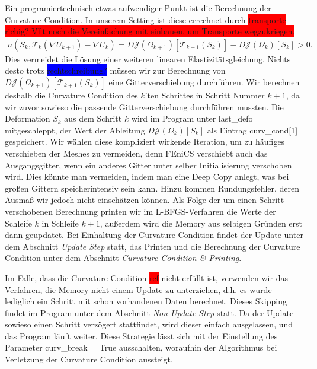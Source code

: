 \documentclass[bibliography=totoc,12pt,a4paper]{scrartcl}
\theoremstyle{exampstyle}
\numberwithin{equation}{section}
\begin{document}
Ein programiertechnisch etwas aufwendiger Punkt ist die Berechnung der Curvature Condition. In unserem Setting ist diese errechnet durch \colorbox{red}{transporte richig? Vllt noch die Vereinfachung mit einbauen, um Transporte wegzukriegen. }
\begin{align*}
	a(S_k, \mathcal{T}_k(\nabla U_{k+1}) - \nabla U_k) = D\mathcal{J}(\Omega_{k+1})[\mathcal{T}_{k+1}(S_k)] - D\mathcal{J}(\Omega_k)[S_k] > 0.
\end{align*}
Dies vermeidet die Lösung einer weiteren linearen Elastizitätsgleichung. Nichts desto trotz \colorbox{blue}{rechtschreibung?} müssen wir zur Berechnung von $D\mathcal{J}(\Omega_{k+1})[\mathcal{T}_{k+1}(S_k)]$ eine Gitterverschiebung durchführen. Wir berechnen deshalb die Curvature Condition des $k$'ten Schrittes in Schritt Nummer $k+1$, da wir zuvor sowieso die passende Gitterverschiebung durchführen mussten. Die Deformation $S_k$ aus dem Schritt $k$ wird im Program unter \textsf{last\_defo} mitgeschleppt, der Wert der Ableitung $D\mathcal{J}(\Omega_k)[S_k]$ als Eintrag \textsf{curv\_cond[1]} gespeichert. Wir wählen diese kompliziert wirkende Iteration, um zu häufiges verschieben der Meshes zu vermeiden, denn FEniCS verschiebt auch das Ausgangsgitter, wenn ein anderes Gitter unter selber Initialisierung verschoben wird. Dies könnte man vermeiden, indem man eine Deep Copy anlegt, was bei großen Gittern speicherintensiv sein kann. Hinzu kommen Rundungsfehler, deren Ausmaß wir jedoch nicht einschätzen können.
Als Folge der um einen Schritt verschobenen Berechnung printen wir im L-BFGS-Verfahren die Werte der Schleife $k$ in Schleife $k+1$, außerdem wird die Memory aus selbigen Gründen erst dann geupdatet. Bei Einhaltung der Curvature Condition findet der Update unter dem Abschnitt \textit{Update Step} statt, das Printen und die Berechnung der Curvature Condition unter dem Abschnitt \textit{Curvature Condition \& Printing}. 

Im Falle, dass die Curvature Condition \colorbox{red}{ref} nicht erfüllt ist, verwenden wir das Verfahren, die Memory nicht einem Update zu unterziehen, d.h. es wurde lediglich ein Schritt mit schon vorhandenen Daten berechnet. Dieses Skipping findet im Program unter dem Abschnitt \textit{Non Update Step} statt. Da der Update sowieso einen Schritt verzögert stattfindet, wird dieser einfach ausgelassen, und das Program läuft weiter. Diese Strategie lässt sich mit der Einstellung des Parameter \textsf{curv\_break = True} ausschalten, woraufhin der Algorithmus bei Verletzung der Curvature Condition aussteigt.
\end{document}
